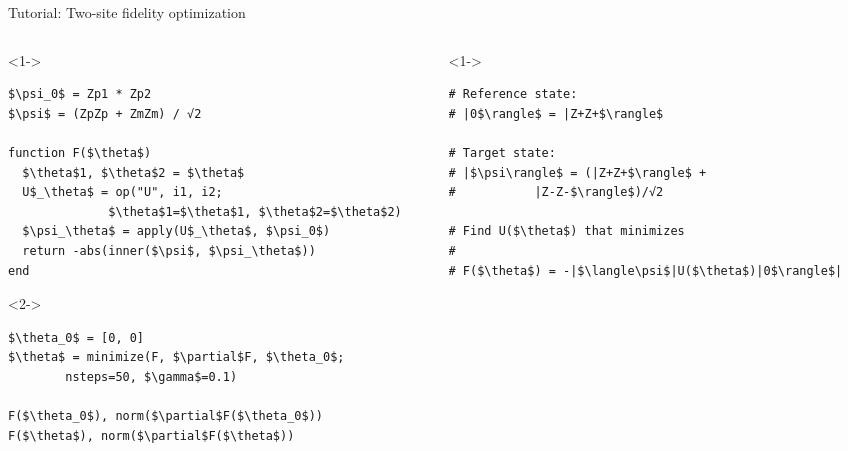 \begin{frame}[fragile]{Tutorial: Two-site fidelity optimization}


\begin{columns}

\begin{column}{5cm}

\begin{onlyenv}<1->

\begin{lstlisting}[language=JuliaLocal, style=julia, mathescape, basicstyle=\small]
$\psi_0$ = Zp1 * Zp2
$\psi$ = (ZpZp + ZmZm) / √2

function F($\theta$)
  $\theta$1, $\theta$2 = $\theta$
  U$_\theta$ = op("U", i1, i2;
              $\theta$1=$\theta$1, $\theta$2=$\theta$2)
  $\psi_\theta$ = apply(U$_\theta$, $\psi_0$)
  return -abs(inner($\psi$, $\psi_\theta$))
end
\end{lstlisting}

\end{onlyenv}

\begin{onlyenv}<2->

\begin{lstlisting}[language=JuliaLocal, style=julia, mathescape, basicstyle=\small]
$\theta_0$ = [0, 0]
$\theta$ = minimize(F, $\partial$F, $\theta_0$;
        nsteps=50, $\gamma$=0.1)

F($\theta_0$), norm($\partial$F($\theta_0$))
F($\theta$), norm($\partial$F($\theta$))
\end{lstlisting}

\end{onlyenv}

\end{column}

\begin{column}{5cm}

\begin{onlyenv}<1->

\begin{lstlisting}[style=julia, numbers=none, mathescape, basicstyle=\small]
# Reference state:
# |0$\rangle$ = |Z+Z+$\rangle$

# Target state:
# |$\psi\rangle$ = (|Z+Z+$\rangle$ +
#           |Z-Z-$\rangle$)/√2

# Find U($\theta$) that minimizes
#
# F($\theta$) = -|$\langle\psi$|U($\theta$)|0$\rangle$|
\end{lstlisting}


\end{onlyenv}
\end{column}
\end{columns}
\end{frame}
